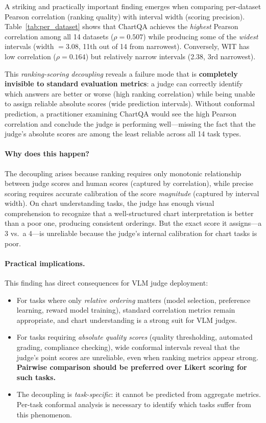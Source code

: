 \documentclass{article}
\begin{document}
A striking and practically important finding emerges when comparing per-dataset Pearson correlation (ranking quality) with interval width (scoring precision). Table~\ref{tab:per_dataset} shows that ChartQA achieves the \emph{highest} Pearson correlation among all 14 datasets ($\rho = 0.507$) while producing some of the \emph{widest} intervals (width $= 3.08$, 11th out of 14 from narrowest). Conversely, WIT has low correlation ($\rho = 0.164$) but relatively narrow intervals (2.38, 3rd narrowest).

This \emph{ranking-scoring decoupling} reveals a failure mode that is \textbf{completely invisible to standard evaluation metrics}: a judge can correctly identify which answers are better or worse (high ranking correlation) while being unable to assign reliable absolute scores (wide prediction intervals). Without conformal prediction, a practitioner examining ChartQA would see the high Pearson correlation and conclude the judge is performing well---missing the fact that the judge's absolute scores are among the least reliable across all 14 task types.

\paragraph{Why does this happen?} The decoupling arises because ranking requires only monotonic relationship between judge scores and human scores (captured by correlation), while precise scoring requires accurate calibration of the score \emph{magnitude} (captured by interval width). On chart understanding tasks, the judge has enough visual comprehension to recognize that a well-structured chart interpretation is better than a poor one, producing consistent orderings. But the exact score it assigns---a 3 vs.\ a 4---is unreliable because the judge's internal calibration for chart tasks is poor.

\paragraph{Practical implications.} This finding has direct consequences for VLM judge deployment:
\begin{itemize}[leftmargin=*,itemsep=1pt,topsep=2pt]
\item For tasks where only \emph{relative ordering} matters (model selection, preference learning, reward model training), standard correlation metrics remain appropriate, and chart understanding is a strong suit for VLM judges.
\item For tasks requiring \emph{absolute quality scores} (quality thresholding, automated grading, compliance checking), wide conformal intervals reveal that the judge's point scores are unreliable, even when ranking metrics appear strong. \textbf{Pairwise comparison should be preferred over Likert scoring for such tasks.}
\item The decoupling is \emph{task-specific}: it cannot be predicted from aggregate metrics. Per-task conformal analysis is necessary to identify which tasks suffer from this phenomenon.
\end{itemize}
\end{document}

